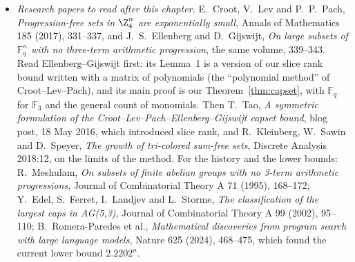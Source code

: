 \begin{itemize}
\item \emph{Research papers to read after this chapter.} E.~Croot, V.~Lev and P.~P.~Pach, \emph{Progression-free sets in $\Z_4^n$ are exponentially small}, Annals of Mathematics 185 (2017), 331--337, and J.~S.~Ellenberg
and D.~Gijswijt, \emph{On large subsets of $\mathbb F_q^n$ with no three-term arithmetic progression}, the same volume, 339--343. Read Ellenberg--Gijswijt first: its Lemma~1 is a version of our slice rank bound
written with a matrix of polynomials (the ``polynomial method'' of Croot--Lev--Pach), and its main proof is our Theorem~\ref{thm:capset}, with $\mathbb F_q$ for $\mathbb F_3$ and the general count of monomials. Then
T.~Tao, \emph{A symmetric formulation of the Croot--Lev--Pach--Ellenberg--Gijswijt capset bound}, blog post, 18 May 2016, which introduced slice rank, and R.~Kleinberg, W.~Sawin and D.~Speyer, \emph{The growth of
tri-colored sum-free sets}, Discrete Analysis 2018:12, on the limits of the method. For the history and the lower bounds: R.~Meshulam, \emph{On subsets of finite abelian groups with no 3-term arithmetic
progressions}, Journal of Combinatorial Theory A 71 (1995), 168--172; Y.~Edel, S.~Ferret, I.~Landjev and L.~Storme, \emph{The classification of the largest caps in AG(5,3)}, Journal of Combinatorial Theory A 99
(2002), 95--110; B.~Romera-Paredes et al., \emph{Mathematical discoveries from program search with large language models}, Nature 625 (2024), 468--475, which found the current lower bound $2.2202^n$.
\end{itemize}
